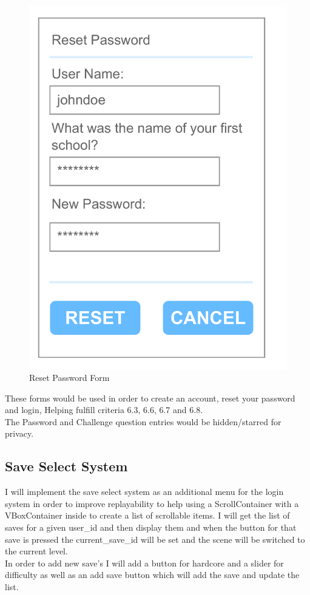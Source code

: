 \documentclass{article}
\begin{document}
\begin{multicols}{3}
\begin{figure}[H]
                        \includegraphics[width = 0.9\columnwidth]{images/design/Reset_Password.pdf}
                        \caption{Reset Password Form}
                \end{figure}
        \end{multicols}\[\]
        These forms would be used in order to create an account, reset your password and login, Helping fulfill criteria 6.3, 6.6, 6.7 and 6.8.\\
        The Password and Challenge question entries would be hidden/starred for privacy.\\
        \newpage
        \subsection{Save Select System}
        I will implement the save select system as an additional menu for the login system in order to improve replayability to help  using a ScrollContainer with a VBoxContainer inside to create a list of scrollable items. I will get the list of saves for a given user\_id and then display them and when the button for that save is pressed the current\_save\_id will be set and the scene will be switched to the current level.\\
        In order to add new save's I will add a button for hardcore and a slider for difficulty as well as an add save button which will add the save and update the list.\\
\end{document}
